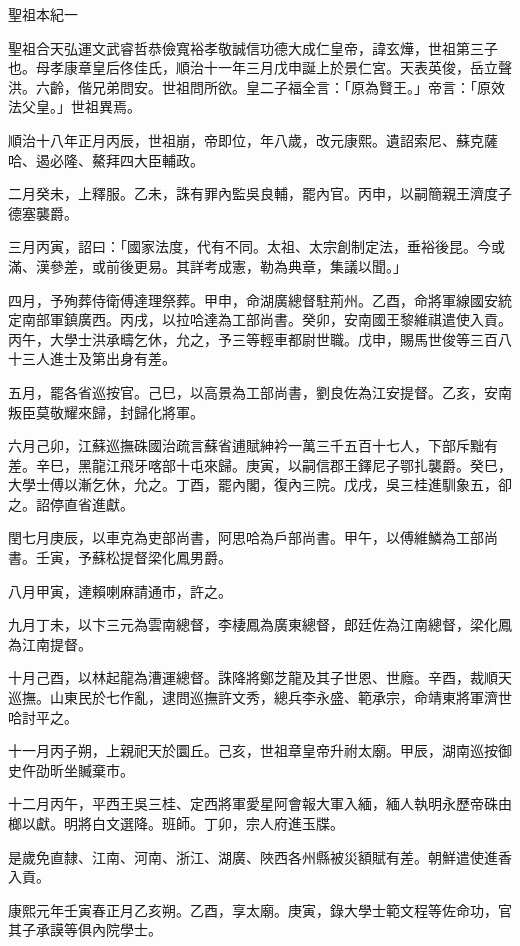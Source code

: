 
\begin{pinyinscope}
聖祖本紀一

聖祖合天弘運文武睿哲恭儉寬裕孝敬誠信功德大成仁皇帝，諱玄燁，世祖第三子也。母孝康章皇后佟佳氏，順治十一年三月戊申誕上於景仁宮。天表英俊，岳立聲洪。六齡，偕兄弟問安。世祖問所欲。皇二子福全言：「原為賢王。」帝言：「原效法父皇。」世祖異焉。

順治十八年正月丙辰，世祖崩，帝即位，年八歲，改元康熙。遺詔索尼、蘇克薩哈、遏必隆、鰲拜四大臣輔政。

二月癸未，上釋服。乙未，誅有罪內監吳良輔，罷內官。丙申，以嗣簡親王濟度子德塞襲爵。

三月丙寅，詔曰：「國家法度，代有不同。太祖、太宗創制定法，垂裕後昆。今或滿、漢參差，或前後更易。其詳考成憲，勒為典章，集議以聞。」

四月，予殉葬侍衛傅達理祭葬。甲申，命湖廣總督駐荊州。乙酉，命將軍線國安統定南部軍鎮廣西。丙戌，以拉哈達為工部尚書。癸卯，安南國王黎維祺遣使入貢。丙午，大學士洪承疇乞休，允之，予三等輕車都尉世職。戊申，賜馬世俊等三百八十三人進士及第出身有差。

五月，罷各省巡按官。己巳，以高景為工部尚書，劉良佐為江安提督。乙亥，安南叛臣莫敬耀來歸，封歸化將軍。

六月己卯，江蘇巡撫硃國治疏言蘇省逋賦紳衿一萬三千五百十七人，下部斥黜有差。辛巳，黑龍江飛牙喀部十屯來歸。庚寅，以嗣信郡王鐸尼子鄂扎襲爵。癸巳，大學士傅以漸乞休，允之。丁酉，罷內閣，復內三院。戊戌，吳三桂進馴象五，卻之。詔停直省進獻。

閏七月庚辰，以車克為吏部尚書，阿思哈為戶部尚書。甲午，以傅維鱗為工部尚書。壬寅，予蘇松提督梁化鳳男爵。

八月甲寅，達賴喇麻請通市，許之。

九月丁未，以卞三元為雲南總督，李棲鳳為廣東總督，郎廷佐為江南總督，梁化鳳為江南提督。

十月己酉，以林起龍為漕運總督。誅降將鄭芝龍及其子世恩、世廕。辛酉，裁順天巡撫。山東民於七作亂，逮問巡撫許文秀，總兵李永盛、範承宗，命靖東將軍濟世哈討平之。

十一月丙子朔，上親祀天於圜丘。己亥，世祖章皇帝升祔太廟。甲辰，湖南巡按御史仵劭昕坐贓棄市。

十二月丙午，平西王吳三桂、定西將軍愛星阿會報大軍入緬，緬人執明永歷帝硃由榔以獻。明將白文選降。班師。丁卯，宗人府進玉牒。

是歲免直隸、江南、河南、浙江、湖廣、陜西各州縣被災額賦有差。朝鮮遣使進香入貢。

康熙元年壬寅春正月乙亥朔。乙酉，享太廟。庚寅，錄大學士範文程等佐命功，官其子承謨等俱內院學士。


\end{pinyinscope}
